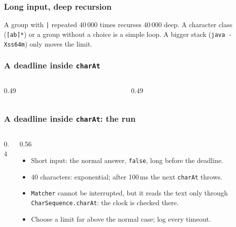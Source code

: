\documentclass[aspectratio=169,10pt,compress]{beamer}
\begin{document}
\begin{frame}[t,fragile] \frametitle{Long input, deep recursion}

  \vspace{0.2em}
  \small A group with \texttt{|} repeated 40\,000 times recurses 40\,000 deep. A character class (\texttt{[ab]*}) or a group without a choice is a simple loop. A bigger stack (\texttt{java -Xss64m}) only moves the limit.
\end{frame}





\begin{frame}[t,fragile] \frametitle{A deadline inside \texttt{charAt}}
  \begin{columns}[T]
    \begin{column}{0.49\textwidth}
    \end{column}
    \begin{column}{0.49\textwidth}
    \end{column}
  \end{columns}
\end{frame}




\begin{frame}[t,fragile] \frametitle{A deadline inside \texttt{charAt}: the run}
  \begin{columns}[T]
    \begin{column}{0.4\textwidth}
    \end{column}
    \begin{column}{0.56\textwidth}
      \begin{itemize}\small
        \item Short input: the normal answer, \texttt{false}, long before the deadline.
        \item 40 characters: exponential; after 100\,ms the next \texttt{charAt} throws.
        \item \texttt{Matcher} cannot be interrupted, but it reads the text only through \texttt{CharSequence.charAt}: the clock is checked there.
        \item Choose a limit far above the normal case; log every timeout.
      \end{itemize}
    \end{column}
  \end{columns}
\end{frame}
\end{document}
